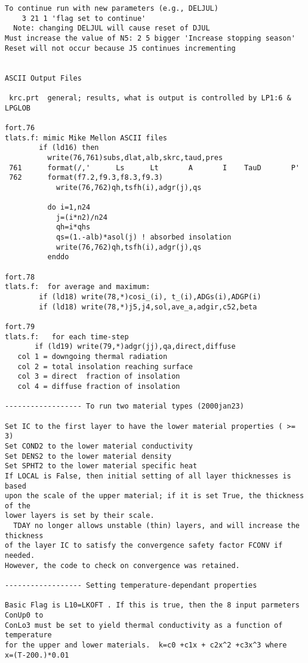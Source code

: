 \begin{verbatim}
To continue run with new parameters (e.g., DELJUL)
	3 21 1 'flag set to continue'
  Note: changing DELJUL will cause reset of DJUL
Must increase the value of N5: 2 5 bigger 'Increase stopping season' 
Reset will not occur because J5 continues incrementing


ASCII Output Files

 krc.prt  general; results, what is output is controlled by LP1:6 & LPGLOB

fort.76
tlats.f: mimic Mike Mellon ASCII files
        if (ld16) then
          write(76,761)subs,dlat,alb,skrc,taud,pres
 761      format(/,'      Ls      Lt       A       I    TauD       P'
 762      format(f7.2,f9.3,f8.3,f9.3)
            write(76,762)qh,tsfh(i),adgr(j),qs

          do i=1,n24
            j=(i*n2)/n24
            qh=i*qhs
            qs=(1.-alb)*asol(j) ! absorbed insolation
            write(76,762)qh,tsfh(i),adgr(j),qs
          enddo

fort.78
tlats.f:  for average and maximum:
        if (ld18) write(78,*)cosi_(i), t_(i),ADGs(i),ADGP(i)
        if (ld18) write(78,*)j5,j4,sol,ave_a,adgir,c52,beta

fort.79
tlats.f:   for each time-step
       if (ld19) write(79,*)adgr(jj),qa,direct,diffuse
   col 1 = downgoing thermal radiation
   col 2 = total insolation reaching surface
   col 3 = direct  fraction of insolation
   col 4 = diffuse fraction of insolation

------------------ To run two material types (2000jan23)

Set IC to the first layer to have the lower material properties ( >= 3)
Set COND2 to the lower material conductivity
Set DENS2 to the lower material density
Set SPHT2 to the lower material specific heat
If LOCAL is False, then initial setting of all layer thicknesses is based
upon the scale of the upper material; if it is set True, the thickness of the
lower layers is set by their scale.
  TDAY no longer allows unstable (thin) layers, and will increase the thickness
of the layer IC to satisfy the convergence safety factor FCONV if needed. 
However, the code to check on convergence was retained.

------------------ Setting temperature-dependant properties

Basic Flag is L10=LKOFT . If this is true, then the 8 input parmeters ConUp0 to
ConLo3 must be set to yield thermal conductivity as a function of temperature
for the upper and lower materials.  k=c0 +c1x + c2x^2 +c3x^3 where
x=(T-200.)*0.01 


\end{verbatim}

